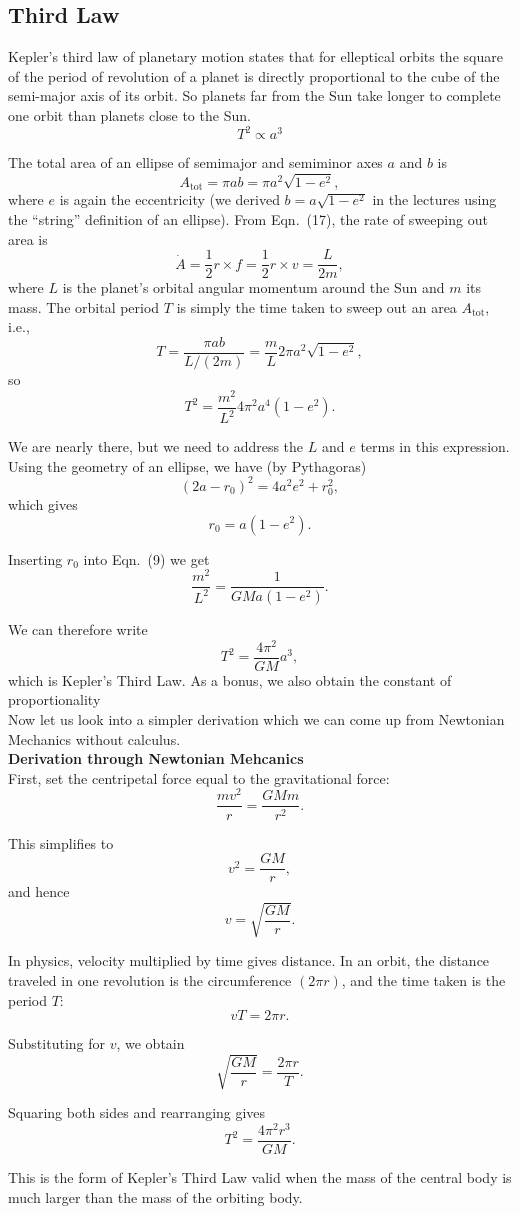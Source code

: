 \documentclass{article}
\begin{document}
\subsection{Third Law}
Kepler’s third law of planetary motion states that for elleptical orbits the square of the period of revolution of a planet is directly proportional to the cube of the semi-major axis of its orbit.
So planets far from the Sun take longer to complete one orbit than planets close to the Sun.
$$T^2 \propto a^3 $$
\begin{tcolorbox}[breakable,colback=red!5!white, colframe=red!75!black, title={Derivation of 3rd Law}]
\noindent
The total area of an ellipse of semimajor and semiminor axes $a$ and $b$ is
\[
A_{\text{tot}} = \pi ab = \pi a^2 \sqrt{1 - e^2},
\]
where $e$ is again the eccentricity (we derived $b = a\sqrt{1 - e^2}$ in the lectures using the ``string'' definition of an ellipse). From Eqn.~(17), the rate of sweeping out area is
\[
\dot{A} = \frac{1}{2} r \times f = \frac{1}{2} r \times v = \frac{L}{2m},
\]
where $L$ is the planet's orbital angular momentum around the Sun and $m$ its mass. The orbital period $T$ is simply the time taken to sweep out an area $A_{\text{tot}}$, i.e.,
\[
T = \frac{\pi ab}{L/(2m)} = \frac{m}{L} 2\pi a^2 \sqrt{1 - e^2},
\]
so
\[
T^2 = \frac{m^2}{L^2} 4\pi^2 a^4 (1 - e^2).
\]

We are nearly there, but we need to address the $L$ and $e$ terms in this expression. Using the geometry of an ellipse, we have (by Pythagoras)
\[
(2a - r_0)^2 = 4a^2 e^2 + r_0^2,
\]
which gives
\[
r_0 = a(1 - e^2).
\]

Inserting $r_0$ into Eqn.~(9) we get
\[
\frac{m^2}{L^2} = \frac{1}{GMa(1 - e^2)}.
\]

We can therefore write
\[
T^2 = \frac{4\pi^2}{GM} a^3,
\]
which is Kepler’s Third Law. As a bonus, we also obtain the constant of proportionality
\\[1EM]
Now let us look into a simpler derivation which we can come up from Newtonian Mechanics without calculus. 
\\[1EM]
\textbf{Derivation through Newtonian Mehcanics}
\\
First, set the centripetal force equal to the gravitational force:
\[
\frac{mv^2}{r} = \frac{GMm}{r^2}.
\]

This simplifies to
\[
v^2 = \frac{GM}{r},
\]
and hence
\[
v = \sqrt{\frac{GM}{r}}.
\]

In physics, velocity multiplied by time gives distance. In an orbit, the distance traveled in one revolution is the circumference $(2\pi r)$, and the time taken is the period $T$:
\[
vT = 2\pi r.
\]

Substituting for $v$, we obtain
\[
\sqrt{\frac{GM}{r}} = \frac{2\pi r}{T}.
\]

Squaring both sides and rearranging gives
\[
T^2 = \frac{4\pi^2 r^3}{GM}.
\]

This is the form of Kepler’s Third Law valid when the mass of the central body is much larger than the mass of the orbiting body. 

\end{tcolorbox}
\end{document}
